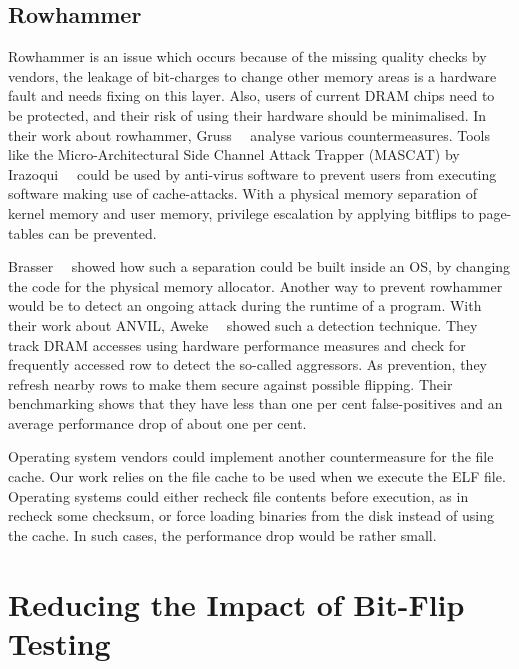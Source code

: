 \subsection{Rowhammer}

Rowhammer is an issue which occurs because of the missing quality checks by
vendors, the leakage of bit-charges to change other memory areas is a hardware
fault and needs fixing on this layer. Also, users of current DRAM chips need to
be protected, and their risk of using their hardware should be minimalised. In
their work about rowhammer, Gruss~\etal~\cite{flipinthewall} analyse various
countermeasures. Tools like the Micro-Architectural Side Channel Attack Trapper
(MASCAT) by Irazoqui~\etal~\cite{mascat} could be used by anti-virus software to
prevent users from executing software making use of cache-attacks. With a
physical memory separation of kernel memory and user memory, privilege
escalation by applying bitflips to page-tables can be prevented.

Brasser~\etal~\cite{canttouch} showed how such a separation could be built
inside an OS, by changing the code for the physical memory allocator. Another
way to prevent rowhammer would be to detect an ongoing attack during the runtime
of a program. With their work about ANVIL, Aweke~\etal~\cite{anvil} showed such
a detection technique. They track DRAM accesses using hardware performance
measures and check for frequently accessed row to detect the so-called
aggressors. As prevention, they refresh nearby rows to make them secure against
possible flipping. Their benchmarking shows that they have less than one per
cent false-positives and an average performance drop of about one per cent.

Operating system vendors could implement another countermeasure for the file
cache. Our work relies on the file cache to be used when we execute the ELF
file. Operating systems could either recheck file contents before execution, as
in recheck some checksum, or force loading binaries from the disk instead of
using the cache. In such cases, the performance drop would be rather small.

\section{Reducing the Impact of Bit-Flip Testing}

